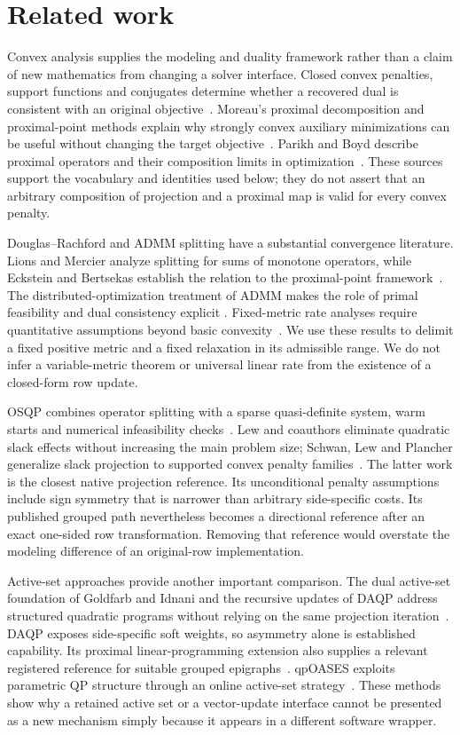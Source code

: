 \section{Related work}\label{sec:related}
Convex analysis supplies the modeling and duality framework rather than a
claim of new mathematics from changing a solver interface. Closed convex
penalties, support functions and conjugates determine whether a recovered
dual is consistent with an original objective~\cite{rockafellar,boydconvex}.
Moreau's proximal decomposition and proximal-point methods explain why
strongly convex auxiliary minimizations can be useful without changing the
target objective~\cite{moreau,rockafellarppa}. Parikh and Boyd describe proximal
operators and their composition limits in optimization~\cite{prox}. These
sources support the vocabulary and identities used below; they do not
assert that an arbitrary composition of projection and a proximal map is
valid for every convex penalty.

Douglas--Rachford and ADMM splitting have a substantial convergence literature.
Lions and Mercier analyze splitting for sums of monotone operators, while
Eckstein and Bertsekas establish the relation to the proximal-point
framework~\cite{lions,eckstein}. The distributed-optimization treatment of
ADMM makes the role of primal feasibility and dual consistency explicit
\cite{admm}. Fixed-metric rate analyses require quantitative assumptions
beyond basic convexity~\cite{giselsson}. We use these results to delimit a
fixed positive metric and a fixed relaxation in its admissible range. We
do not infer a variable-metric theorem or universal linear rate from the
existence of a closed-form row update.

OSQP combines operator splitting with a sparse quasi-definite system,
warm starts and numerical infeasibility checks~\cite{osqp}. Lew and
coauthors eliminate quadratic slack effects without increasing the main
problem size; Schwan, Lew and Plancher generalize slack projection to
supported convex penalty families~\cite{lew,gsp}. The latter work is the
closest native projection reference. Its unconditional penalty assumptions
include sign symmetry that is narrower than arbitrary side-specific costs.
Its published grouped path nevertheless becomes a directional reference
after an exact one-sided row transformation. Removing that reference would
overstate the modeling difference of an original-row implementation.

Active-set approaches provide another important comparison. The dual
active-set foundation of Goldfarb and Idnani and the recursive updates of
DAQP address structured quadratic programs without relying on the same
projection iteration~\cite{goldfarb,daqp}. DAQP exposes side-specific soft
weights, so asymmetry alone is established capability. Its proximal
linear-programming extension also supplies a relevant registered reference
for suitable grouped epigraphs~\cite{daqpprox}. qpOASES exploits parametric
QP structure through an online active-set strategy~\cite{qpOASES}. These
methods show why a retained active set or a vector-update interface cannot
be presented as a new mechanism simply because it appears in a different
software wrapper.

